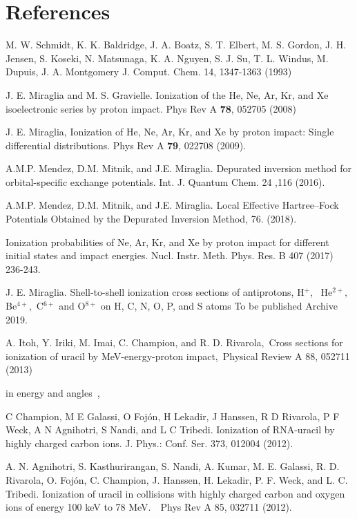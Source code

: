 \documentclass[preprint,12pt]{article}
\begin{document}
\bigskip

\section{References}

\begin{thebibliography}{99}

M. W. Schmidt, K. K. Baldridge, J. A. Boatz, S. T. Elbert, M. S. Gordon, 
J. H. Jensen, S. Koseki, N. Matsunaga, K. A. Nguyen, S. J. Su, T. L. Windus, 
M. Dupuis, J. A. Montgomery 
J. Comput. Chem. 14, 1347-1363 (1993)

J. E. Miraglia and M. S. Gravielle. Ionization of the
He, Ne, Ar, Kr, and Xe isoelectronic series by proton impact. Phys Rev A 
\textbf{78}, 052705 (2008)

J. E. Miraglia, Ionization of He, Ne, Ar, Kr, and Xe
by proton impact: Single differential distributions. Phys Rev A \textbf{79},
022708 (2009).

A.M.P. Mendez, D.M. Mitnik, and J.E. Miraglia.
Depurated inversion method for orbital-specific exchange potentials. 
Int. J. Quantum Chem. 24 ,116 (2016).

A.M.P. Mendez, D.M. Mitnik, and J.E. Miraglia. Local Effective 
Hartree--Fock Potentials Obtained by the Depurated Inversion Method,
76. (2018).

Ionization probabilities of Ne, Ar, Kr, and Xe by
proton impact for different initial states and impact energies. Nucl. Instr.
Meth. Phys. Res. B 407 (2017) 236-243.

J. E. Miraglia. Shell-to-shell ionization cross
sections of antiprotons, H$^{+}$, \ He$^{2+},$ Be$^{4+},$ C$^{6+}$ and O$%
^{8+}$ on H, C, N, O, P, and S atoms To be published Archive 2019.

A. Itoh, Y. Iriki, M. Imai, C. Champion, and R. D.
Rivarola,~Cross sections for ionization of uracil by MeV-energy-proton
impact,\ Physical Review A 88, 052711 (2013)

\bibitem{} in energy and angles~,

C Champion, M E Galassi, O Foj\'{o}n, H Lekadir, J Hanssen, R D Rivarola,
P F Weck, A N Agnihotri, S Nandi, and L C Tribedi. Ionization of RNA-uracil
by highly charged carbon ions. J. Phys.: Conf. Ser. 373, 012004 (2012).

A. N. Agnihotri, S. Kasthurirangan, S. Nandi, A.
Kumar, M. E. Galassi, R. D. Rivarola, O. Foj\'{o}n, C. Champion, J. Hanssen,
H. Lekadir, P. F. Weck, and L. C. Tribedi. Ionization of uracil in
collisions with highly charged carbon and oxygen ions of energy 100 keV to
78 MeV.\ \ Phys Rev A 85, 032711 (2012).


\end{thebibliography}
\end{document}
